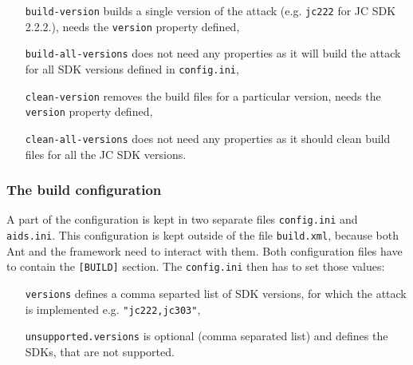                 \begin{enumerate}[align=left]
                    \item[\texttt{build-version}] builds a single version of the attack (e.g. \texttt{jc222} for JC SDK 2.2.2.), needs the \texttt{version} property defined,
                    \item[\texttt{build-all-versions}] does not need any properties as it will build the attack for all SDK versions defined in \texttt{config.ini}, 
                    \item[\texttt{clean-version}] removes the build files for a particular version, needs the \texttt{version} property defined,
                    \item[\texttt{clean-all-versions}]  does not need any properties as it should clean build files for all the JC SDK versions.
                \end{enumerate}

            \subsubsection{The build configuration}
                A part of the configuration is kept in two separate files \texttt{config.ini} and \texttt{aids.ini}. This configuration is kept outside of the file \texttt{build.xml}, because both Ant and the framework need to interact with them. Both configuration files have to contain the \texttt{[BUILD]} section. The \texttt{config.ini} then has to set those values:
                \begin{enumerate}[align=left]
                    \item[\texttt{versions}] defines a comma separted list of SDK versions, for which the attack is implemented e.g. \texttt{"jc222,jc303"},
                    \item[\texttt{unsupported.versions}] is optional (comma separated list) and defines the SDKs, that are not supported.
                \end{enumerate}

